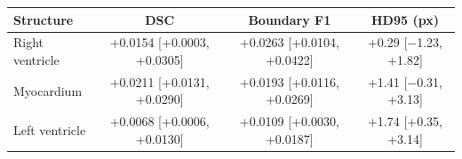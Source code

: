 \begin{tabular}{lccc}
\toprule
Structure & DSC & Boundary F1 & HD95 (px) \\
\midrule
Right ventricle & +0.0154 [+0.0003, +0.0305] & +0.0263 [+0.0104, +0.0422] & +0.29 [$-$1.23, +1.82] \\
Myocardium & +0.0211 [+0.0131, +0.0290] & +0.0193 [+0.0116, +0.0269] & +1.41 [$-$0.31, +3.13] \\
Left ventricle & +0.0068 [+0.0006, +0.0130] & +0.0109 [+0.0030, +0.0187] & +1.74 [+0.35, +3.14] \\
\bottomrule
\end{tabular}
